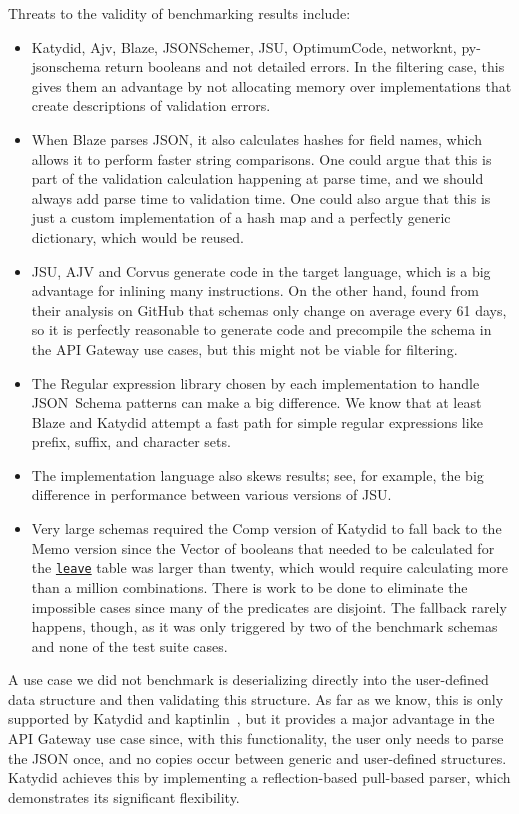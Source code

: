 \documentclass[acmsmall,%
  screen,%
  authorversion, %
  nonacm%
]{acmart}
\newcommand{\link}[2]{\mbox{\hyperref[#2]{\lstinline{#1}}}\xspace}
\newcommand{\leave}{\link{leave}{def leave}}
\newcommand{\JSONSchema}{%
  JSON~Schema\xspace%
}
\newcommand{\GitHub}{%
  GitHub\xspace%
}
\newcommand{\JSON}{\ac{JSON}\xspace}
\begin{document}
Threats to the validity of benchmarking results include:
\begin{itemize}
\item Katydid, Ajv, Blaze, JSONSchemer, JSU, OptimumCode, networknt, py-jsonschema return booleans and not detailed errors. In the filtering case, this gives them an advantage by not allocating memory over implementations that create descriptions of validation errors.
\item When Blaze parses \JSON, it also calculates hashes for field names, which allows it to perform faster string comparisons. One could argue that this is part of the validation calculation happening at parse time, and we should always add parse time to validation time. One could also argue that this is just a custom implementation of a hash map and a perfectly generic dictionary, which would be reused.
\item JSU, AJV and Corvus generate code in the target language, which is a big advantage for inlining many instructions. On the other hand, \citet{blaze} found from their analysis on \GitHub that schemas only change on average every 61 days, so it is perfectly reasonable to generate code and precompile the schema in the API Gateway use cases, but this might not be viable for filtering.
\item The Regular expression library chosen by each implementation to handle \JSONSchema patterns can make a big difference. We know that at least Blaze and Katydid attempt a fast path for simple regular expressions like prefix, suffix, and character sets.
\item The implementation language also skews results; see, for example, the big difference in performance between various versions of JSU.
\item Very large schemas required the Comp version of Katydid to fall back to the Memo version since the Vector of booleans that needed to be calculated for the \leave table was larger than twenty, which would require calculating more than a million combinations. There is work to be done to eliminate the impossible cases since many of the predicates are disjoint. The fallback rarely happens, though, as it was only triggered by two of the benchmark schemas and none of the test suite cases. 
\end{itemize}

A use case we did not benchmark is deserializing directly into the user-defined data structure and then validating this structure.
As far as we know, this is only supported by Katydid and kaptinlin~\cite{jsonschema_impl_go-kaptinlin}, but it provides a major advantage in the API Gateway use case since, with this functionality, the user only needs to parse the \JSON once, and no copies occur between generic and user-defined structures.
Katydid achieves this by implementing a reflection-based pull-based parser, which demonstrates its significant flexibility.
\end{document}
